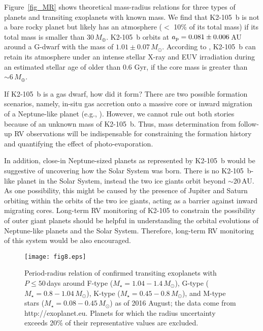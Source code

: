 \documentclass[]{pasj01}
\begin{document}
Figure~\ref{fig_MR} shows theoretical mass-radius relations for three types of planets
and transiting exoplanets with known mass.
We find that K2-105~b is not a bare rocky planet but likely has
an atmosphere ($<$ 10\% of its total mass) if its total mass is smaller than $30\,M_{\oplus}$.
K2-105~b orbits at $a_{\rm p} = 0.081 \pm 0.006$\,AU around a G-dwarf with
the mass of $1.01 \pm 0.07\,M_\odot$.
According to \citet{2013ApJ...775..105O}, K2-105~b can retain its atmosphere
under an intense stellar X-ray and EUV irradiation during an estimated stellar age of
older than 0.6 Gyr, if the core mass is greater than $\sim 6\,M_\oplus$.

If K2-105~b is a gas dwarf, how did it form?
There are two possible formation scenarios, namely, in-situ gas accretion onto a massive core
\citep{2012ApJ...753...66I,2014ApJ...797...95L,2015MNRAS.447.3512O} or inward migration of
a Neptune-like planet (e.g., \cite{2014ApJ...791..103B}).
However, we cannot rule out both stories because of an unknown mass of K2-105~b.
Thus, mass determination from follow-up RV observations will be indispensable for 
constraining the formation history and quantifying the effect of photo-evaporation.

In addition, close-in Neptune-sized planets as represented by K2-105~b would be
suggestive of uncovering how the Solar System was born.
There is no K2-105~b-like planet in the Solar System,
instead the two ice giants orbit beyond $\sim$20\,AU.
As one possibility, this might be caused by the presence of Jupiter and Saturn orbiting
within the orbits of the two ice giants, acting as a barrier against inward migrating cores.
Long-term RV monitoring of K2-105 to constrain the possibility of outer giant planets
should be helpful in understanding the orbital evolutions of Neptune-like planets and the Solar System.
Therefore, long-term RV monitoring of this system would be also encouraged.

	\begin{figure}[tp]
			\texttt{[image: fig8.eps]} 
				\caption{Period-radius relation of confirmed transiting exoplanets with
				$P \leq 50$\,days around F-type ($M_\star = 1.04 - 1.4\,M_\odot$),
				G-type ($M_\star = 0.8 -1.04\,M_\odot$), K-type ($M_\star = 0.45 -0.8\,M_\odot$),
				and M-type stars ($M_\star = 0.08 -0.45\,M_\odot$) as of 2016 August;
				the data come from http://exoplanet.eu.
				Planets for which the radius uncertainty exceeds 20\% of their representative values are excluded.}
			\label{fig_PR}
	\end{figure}
\end{document}
